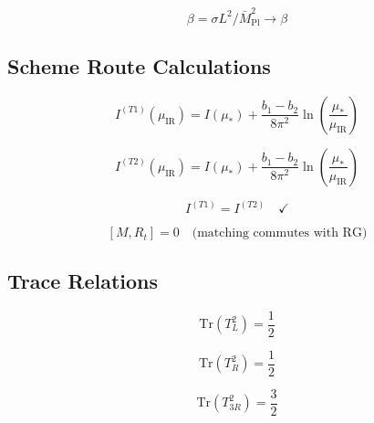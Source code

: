 \documentclass[11pt,a4paper]{article}
\theoremstyle{definition}
\begin{document}
\begin{equation}
\label{eq:unit_ext_10}
\beta = \sigma L^2/\bar{M}_{\text{Pl}}^2 \to \beta
\end{equation}

\subsection{Scheme Route Calculations}
\label{subsec:scheme_extended}

\begin{equation}
\label{eq:sch_ext_1}
I^{(T1)}(\mu_{\text{IR}}) = I(\mu_*) + \frac{b_1 - b_2}{8\pi^2}\ln\left(\frac{\mu_*}{\mu_{\text{IR}}}\right)
\end{equation}

\begin{equation}
\label{eq:sch_ext_2}
I^{(T2)}(\mu_{\text{IR}}) = I(\mu_*) + \frac{b_1 - b_2}{8\pi^2}\ln\left(\frac{\mu_*}{\mu_{\text{IR}}}\right)
\end{equation}

\begin{equation}
\label{eq:sch_ext_3}
I^{(T1)} = I^{(T2)} \quad \checkmark
\end{equation}

\begin{equation}
\label{eq:sch_ext_4}
[M, R_t] = 0 \quad \text{(matching commutes with RG)}
\end{equation}

\subsection{Trace Relations}
\label{subsec:trace_extended}

\begin{equation}
\label{eq:trace_ext_1}
\text{Tr}(T_L^2) = \frac{1}{2}
\end{equation}

\begin{equation}
\label{eq:trace_ext_2}
\text{Tr}(T_R^2) = \frac{1}{2}
\end{equation}

\begin{equation}
\label{eq:trace_ext_3}
\text{Tr}(T_{3R}^2) = \frac{3}{2}
\end{equation}
\end{document}
